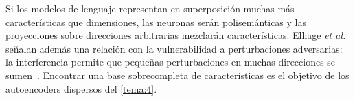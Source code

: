 \begin{observacion}\label{obs:superposicion-llm}
Si los modelos de lenguaje representan en superposición muchas más características que dimensiones, las neuronas serán polisemánticas y las proyecciones sobre direcciones arbitrarias mezclarán características. Elhage \emph{et al.} señalan además una relación con la vulnerabilidad a perturbaciones adversarias: la interferencia permite que pequeñas perturbaciones en muchas direcciones se sumen~\cite[«Relationship to Adversarial Robustness»]{elhage22}. Encontrar una base sobrecompleta de características es el objetivo de los autoencoders dispersos del \cref{tema:4}.
\end{observacion}

